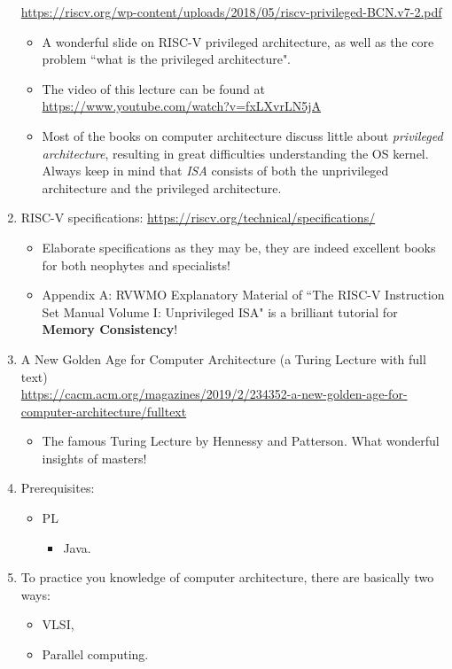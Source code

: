 \documentclass{article}
\begin{document}
\begin{enumerate}
    \href{https://riscv.org/wp-content/uploads/2018/05/riscv-privileged-BCN.v7-2.pdf}{https://riscv.org/wp-content/uploads/2018/05/riscv-privileged-BCN.v7-2.pdf}
    \begin{itemize}
        \item A wonderful slide on RISC-V privileged architecture, as well as the core problem ``what is the privileged architecture".
        \item The video of this lecture can be found at\\ \href{https://www.youtube.com/watch?v=fxLXvrLN5jA}{https://www.youtube.com/watch?v=fxLXvrLN5jA}
        \item Most of the books on computer architecture discuss little about \emph{privileged architecture}, resulting in great difficulties understanding the OS kernel.
        Always keep in mind that \emph{ISA} consists of both the unprivileged architecture and the privileged architecture.
    \end{itemize}
    \item RISC-V specifications:
    \href{https://riscv.org/technical/specifications/}{https://riscv.org/technical/specifications/}
    \begin{itemize}
        \item Elaborate specifications as they may be, they are indeed excellent books for both neophytes and specialists!
        \item Appendix A: RVWMO Explanatory Material of ``The RISC-V Instruction Set Manual Volume I: Unprivileged ISA" is a brilliant tutorial for \textbf{Memory Consistency}!
    \end{itemize}
    \item A New Golden Age for Computer Architecture (a Turing Lecture with full text)\\
    \href{https://cacm.acm.org/magazines/2019/2/234352-a-new-golden-age-for-computer-architecture/fulltext}{https://cacm.acm.org/magazines/2019/2/234352-a-new-golden-age-for-computer-architecture/fulltext}
    \begin{itemize}
        \item The famous Turing Lecture by Hennessy and Patterson.
        What wonderful insights of masters!
    \end{itemize}
    \item Prerequisites:
    \begin{itemize}
        \item PL
        \begin{itemize}
            \item Java.
        \end{itemize}
    \end{itemize}
    \item To practice you knowledge of computer architecture, there are basically two ways:
    \begin{itemize}
        \item VLSI,
        \item Parallel computing.
    \end{itemize}
\end{enumerate}
\end{document}

